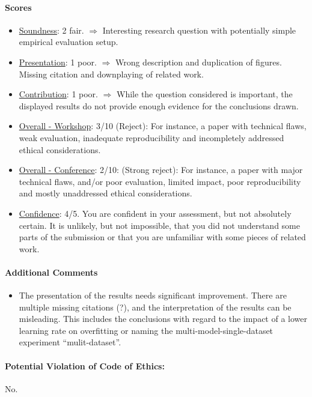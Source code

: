 \documentclass[11pt, a4paper]{include/gdm_format}
\begin{document}
\paragraph{Scores}
\begin{itemize}
    \item \underline{Soundness}: 2 fair. $\Rightarrow$ Interesting research question with potentially simple empirical evaluation setup. 
    \item \underline{Presentation}: 1 poor. $\Rightarrow$ Wrong description and duplication of figures. Missing citation and downplaying of related work.
    \item \underline{Contribution}: 1 poor. $\Rightarrow$ While the question considered is important, the displayed results do not provide enough evidence for the conclusions drawn.
    \item \underline{Overall - Workshop}: 3/10 (Reject): For instance, a paper with technical flaws, weak evaluation, inadequate reproducibility and incompletely addressed ethical considerations.
    \item \underline{Overall - Conference}: 2/10: (Strong reject): For instance, a paper with major technical flaws, and/or poor evaluation, limited impact, poor reproducibility and mostly unaddressed ethical considerations.
    \item \underline{Confidence}: 4/5. You are confident in your assessment, but not absolutely certain. It is unlikely, but not impossible, that you did not understand some parts of the submission or that you are unfamiliar with some pieces of related work.
\end{itemize}


\paragraph{Additional Comments}
\begin{itemize}
    \item The presentation of the results needs significant improvement. There are multiple missing citations (?), and the interpretation of the results can be misleading. This includes the conclusions with regard to the impact of a lower learning rate on overfitting or naming the multi-model-single-dataset experiment ``mulit-dataset''.
\end{itemize}

\paragraph{Potential Violation of Code of Ethics:} No.
\end{document}
